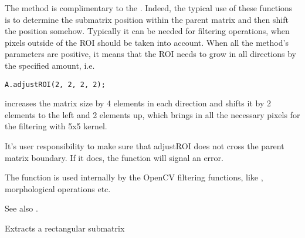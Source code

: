 \begin{description}
\end{description}

The method is complimentary to the . Indeed, the typical use of these functions is to determine the submatrix position within the parent matrix and then shift the position somehow. Typically it can be needed for filtering operations, when pixels outside of the ROI should be taken into account. When all the method's parameters are positive, it means that the ROI needs to grow in all directions by the specified amount, i.e.

\begin{lstlisting}
A.adjustROI(2, 2, 2, 2);
\end{lstlisting}

increases the matrix size by 4 elements in each direction and shifts it by 2 elements to the left and 2 elements up, which brings in all the necessary pixels for the filtering with 5x5 kernel.

It's user responsibility to make sure that adjustROI does not cross the parent matrix boundary. If it does, the function will signal an error.

The function is used internally by the OpenCV filtering functions, like , morphological operations etc.

See also .

Extracts a rectangular submatrix

\begin{description}
\end{description}

